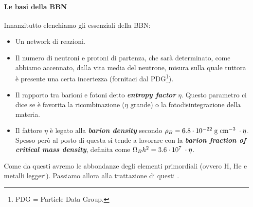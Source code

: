 
\paragraph{Le basi della BBN} Innanzitutto elenchiamo gli  essenziali della BBN:
\begin{itemize}
    \item Un network di reazioni.
    \item Il numero di neutroni e protoni di partenza, che sarà determinato, come abbiamo accennato, dalla vita media del neutrone, misura sulla quale tuttora è presente una certa incertezza (fornitaci dal PDG\footnote{PDG = Particle Data Group.}).
    \item Il rapporto tra barioni e fotoni detto \textbf{\textit{entropy factor}} $\eta$. Questo parametro ci dice se è favorita la ricombinazione ($\eta$ grande) o la fotodisintegrazione della materia.
    \item Il fattore $\eta$ è legato alla \textbf{\textit{barion density}} secondo $\rho_B = 6.8\cdot10^{-22}\;\mbox{g cm}^{-3}\; \cdot \eta$. Spesso però al posto di questa si tende a lavorare con la \textbf{\textit{barion fraction of critical mass density}}, definita come $\Omega_B h^2= 3.6 \cdot10^{7}\;\cdot \eta$.
\end{itemize}
Come  da questi avremo le abbondanze degli elementi primordiali (ovvero H, He e metalli leggeri). Passiamo allora alla trattazione di questi .

